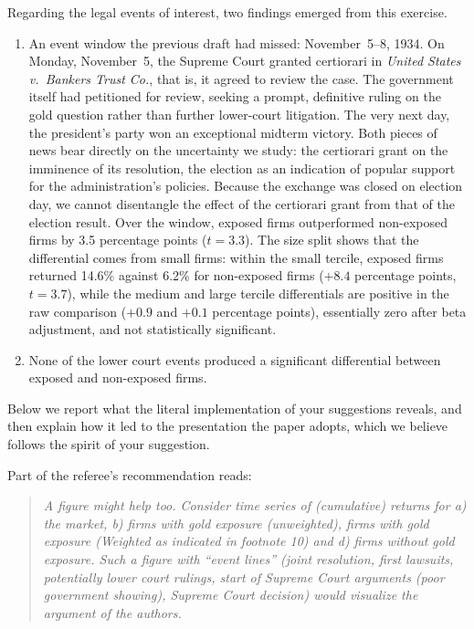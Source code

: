 \medskip
\noindent Regarding the legal events of interest, two findings emerged from this exercise.
\begin{enumerate}
\item An event window the previous draft had missed: November~5--8, 1934. On Monday, November~5, the Supreme Court granted certiorari in \textit{United States v.\ Bankers Trust Co.}, that is, it agreed to review the case. The government itself had petitioned for review, seeking a prompt, definitive ruling on the gold question rather than further lower-court litigation. The very next day, the president's party won an exceptional midterm victory. Both pieces of news bear directly on the uncertainty we study: the certiorari grant on the imminence of its resolution, the election as an indication of popular support for the administration's policies. Because the exchange was closed on election day, we cannot disentangle the effect of the certiorari grant from that of the election result. Over the window, exposed firms outperformed non-exposed firms by 3.5 percentage points ($t = 3.3$). The size split shows that the differential comes from small firms: within the small tercile, exposed firms returned 14.6\% against 6.2\% for non-exposed firms ($+8.4$ percentage points, $t = 3.7$), while the medium and large tercile differentials are positive in the raw comparison ($+0.9$ and $+0.1$ percentage points), essentially zero after beta adjustment, and not statistically significant.\item None of the lower court events produced a significant differential between exposed and non-exposed firms.
\end{enumerate}
\noindent Below we report what the literal implementation of your suggestions reveals, and then explain how it led to the presentation the paper adopts, which we believe follows the spirit of your suggestion.

\medskip
\noindent Part of the referee's recommendation reads:

\begin{quote}
\textit{\textcolor{red!60!black}{A figure might help too. Consider time series of (cumulative) returns for a) the market, b) firms with gold exposure (unweighted), firms with gold exposure (Weighted as indicated in footnote 10) and d) firms without gold exposure. Such a figure with ``event lines'' (joint resolution, first lawsuits, potentially lower court rulings, start of Supreme Court arguments (poor government showing), Supreme Court decision) would visualize the argument of the authors.}}
\end{quote}

